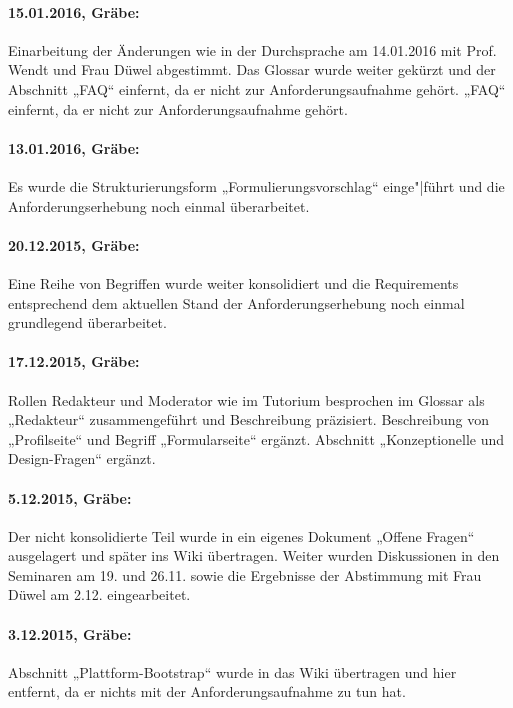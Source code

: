 \documentclass[a4paper,11pt]{article}
\begin{document}
\paragraph{15.01.2016, Gräbe:} 
Einarbeitung der Änderungen wie in der Durchsprache am 14.01.2016 mit
Prof. Wendt und Frau Düwel abgestimmt.  Das Glossar wurde weiter gekürzt und
der Abschnitt „FAQ“ einfernt, da er nicht zur Anforderungsaufnahme gehört.
 „FAQ“ einfernt, da er nicht zur Anforderungsaufnahme gehört.

\paragraph{13.01.2016, Gräbe:} 
Es wurde die Strukturierungsform „Formulierungsvorschlag“ einge"|führt und die
Anforderungserhebung noch einmal überarbeitet.

\paragraph{20.12.2015, Gräbe:} 
Eine Reihe von Begriffen wurde weiter konsolidiert und die Requirements
entsprechend dem aktuellen Stand der Anforderungserhebung noch einmal
grundlegend überarbeitet.

\paragraph{17.12.2015, Gräbe:} 
Rollen Redakteur und Moderator wie im Tutorium besprochen im Glossar als
„Redakteur“ zusammengeführt und Beschreibung präzisiert. Beschreibung von
„Profilseite“ und Begriff „Formularseite“ ergänzt. Abschnitt „Konzeptionelle
und Design-Fragen“ ergänzt.

\paragraph{5.12.2015, Gräbe:} 
Der nicht konsolidierte Teil wurde in ein eigenes Dokument „Offene Fragen“
ausgelagert und später ins Wiki übertragen.  Weiter wurden Diskussionen in den
Seminaren am 19. und 26.11. sowie die Ergebnisse der Abstimmung mit Frau Düwel
am 2.12. eingearbeitet.

\paragraph{3.12.2015, Gräbe:} 
Abschnitt „Plattform-Bootstrap“ wurde in das Wiki übertragen und hier entfernt,
da er nichts mit der Anforderungsaufnahme zu tun hat.
\end{document}
